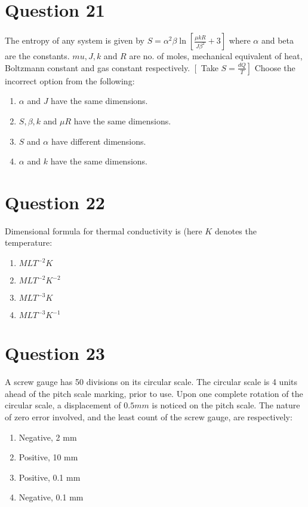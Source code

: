 \documentclass{article}
\begin{document}
\section*{Question 21}
The entropy of any system is given by \(S=\alpha^2 \beta \ln \left[\frac{\mu k R}{J \beta^2}+3\right]\)
where \(\alpha\) and beta are the constants. \(mu , J, k\) and \(R\) are no. of moles, mechanical equivalent of heat, Boltzmann constant and gas constant respectively.
\(\left[\right.\) Take \(\left.S=\frac{d Q}{T}\right]\)
Choose the incorrect option from the following: 
\begin{enumerate}[label=(\alph*)]
\item \(\alpha\) and \(J\) have the same dimensions.
\item \(S, \beta, k\) and \(\mu R\) have the same dimensions.
\item \(S\) and \(\alpha\) have different dimensions.
\item \(\alpha\) and \(k\) have the same dimensions.
\end{enumerate}
\newpage
\section*{Question 22}
Dimensional formula for thermal conductivity is (here \(K\) denotes the temperature: 
\begin{enumerate}[label=(\alph*)]
\item \(M L T^{-2} K\)
\item \(M L T^{-2} K^{-2}\)
\item \(M L T^{-3} K\)
\item \(M L T^{-3} K^{-1}\)
\end{enumerate}
\newpage
\section*{Question 23}
A screw gauge has 50 divisions on its circular scale. The circular scale is 4 units ahead of the pitch scale marking, prior to use. Upon one complete rotation of the circular scale, a displacement of \(0.5 mm\) is noticed on the pitch scale. The nature of zero error involved, and the least count of the screw gauge, are respectively:
\begin{enumerate}[label=(\alph*)]
\item Negative, 2 mm
\item Positive, 10 mm
\item Positive, 0.1 mm
\item Negative, 0.1 mm
\end{enumerate}
\newpage
\end{document}
